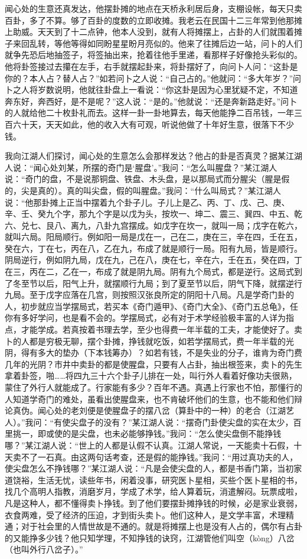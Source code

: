 \documentclass[12pt,UTF8]{ctexbook}
\begin{document}
闻心处的生意还真发达，他摆卦摊的地点在天桥永利居后身，支棚设帐，每天只卖百卦，多了不算。够了百卦的度数的立即收摊。我老云在民国十二三年常到他那摊上助威。天天到了十二点钟，他本人没到，就有人将摊摆上，占卦的人们就围着摊子来回乱转，等他等得如同盼星星盼月亮似的。他来了往摊后边一站，问卜的人们就争先恐后地抽签子，将签抽出来，抢着往他手里递，看那样子好像抢头彩似的。他将卦签接过去攥在左手，右手就摆起卦来，将卦摆好了，向问卜人问：“这卦是你的？本人占？替人占？”如若问卜之人说：“自己占的。”他就问：“多大年岁？”问卜之人将岁数说明，他就往卦盘上一看说：“你这卦是因为心里犹疑不定，不知道奔东好，奔西好，是不是呢？”这人说：“是的。”他就说：“还是奔新路走好。”问卜的人就给他二十枚卦礼而去。这样一卦一卦地算去，每天他能挣二百吊钱，一年三百六十天，天天如此，他的收入大有可观，听说他做了十年好生意，很落下不少钱。

我向江湖人们探讨，闻心处的生意怎么会那样发达？他占的卦是否真灵？据某江湖人说：“闻心处刘某，所摆的奇门是‘腥盘’。”我问：“怎么叫腥盘？”某江湖人说：“奇门的盘，不是说那铜盘、铁盘、木头盘，是以那局式而分腥尖（腥是假的，尖是真的）。真的叫尖盘，假的叫腥盘。”我问：“什么叫局式？”某江湖人说：“他那卦摊上正当中摆着九个卦子儿。子儿上是乙、丙、丁、戊、己、庚、辛、壬、癸九个字，那九个字是以戊为头，按坎一、坤二、震三、巽四、中五、乾六、兑七、艮八、离九，八卦九宫摆成。如戊字在坎一，就叫一局；戊字在乾六，就叫六局。阳局顺行。例如阳一局是戊在一，己在二，庚在三，辛在四，壬在五，癸在六，丁在七，丙在八，乙在九，布成了就是顺行一局。阳有九局，皆是顺行。阴局逆行，例如阴九局，戊在九，己在八，庚在七，辛在六，壬在五，癸在四，丁在三，丙在二，乙在一，布成了就是阴九局。阴有九个局式，都是逆行。这局式到了冬至节以后，阳气上升，就摆顺行九局；到了夏至节以后，阴气下降，就摆逆行九局。至于戊字应落在几宫，则按照汉张良所定的阴阳十八局。凡是学奇门卦的人，初步就应当学摆局式，若买本《奇门遁甲》、《奇门大全》、《奇门五总龟》，任你有多好学问，也是看不会的。学摆局式，必有对于术学经验极丰富的人详为指点，才能学成。若真按着书理去学，至少也得费一年半载的工夫，才能使好了。卖卜的人都是穷极无聊，摆个卦摊，挣钱就吃饭，如若学摆局式，费一年半载的光阴，得有多大的垫办（下本钱筹办）？如若有钱，不是失业的分子，谁肯为奇门费几年的光阴？市井中卖卦的都是使腥盘，只要有人占卦，抽出根签来，卖卜的先生拿着卦签，啪……将四九三十六个卦子儿排在一处，叫行外人看着好像功夫很熟，蒙住了外行人就能成了。行家能有多少？百年不遇。真遇上行家也不怕，那懂行的人知道学奇门的难处，虽看出使腥盘来，也不肯破坏他们的生意，也不能和他们辩论真伪。闻心处的老刘便是使腥盘子的摆八岔（算卦中的一种）的老合（江湖艺人）。”我问：“有使尖盘子的没有？”某江湖人说：“摆奇门卦使尖盘的实在太少，百里挑一，即或使的是尖盘，也未必能够挣钱。”我问：“怎么使尖盘倒不能挣钱哪？”某江湖人说：“世上的人都是认假不认真。江湖人常说，一天能卖十石假，十天卖不了一石真。由这两句话考查，还是假的能挣钱。”我问：“用过真功夫的人，使尖盘怎么不挣钱哪？”某江湖人说：“凡是会使尖盘的人，都是书香门第，当初家道饶裕，生活无忧，读些年书，闲着没事，研究医卜星相，买些个医卜星相的书，找几个高明人指教，消磨岁月，学成了术学，给人算着玩，消遣解闷。玩票成啦，凡是这种人，都不懂得卖卜挣钱。到了他们要摆卦摊挣钱的时候，必是家业衰弱，衣食两难，受了经济的压迫，才到街头卖卜。他们这种人，是文学丰富，术理精通；对于社会里的人情世故是不通的。就是将摊摆上也是没有人占的，偶尔有占卦的又能挣多少钱？他只知学理，不知挣钱的诀窍，江湖管他们叫空（kòng）八岔（也叫外行八岔子）。”
\end{document}

